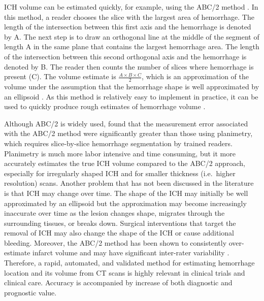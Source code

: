 \documentclass{elsarticle_nonatbib}\usepackage[]{graphicx}\usepackage[]{color}
\begin{document}
ICH volume can be estimated quickly, for example,  using the ABC/2 method \citep{broderick_volume_1993}.  In this method, a reader chooses the slice with the largest area of hemorrhage.  The length of the intersection between this first axis and the hemorrhage is denoted by A. The next step is to draw an orthogonal line  at the middle of the segment of length A in the same plane that contains the largest hemorrhage area. The length of the intersection between this second orthogonal axis and the hemorrhage is denoted by B.  The reader then counts the number of slices where hemorrhage is present (C).  The volume estimate is $\frac{A\times B\times C}{2}$, which is an approximation of the volume under the assumption that the hemorrhage shape is well approximated by an ellipsoid \citep{kothari_abcs_1996}.  As this method is relatively easy to implement in practice, it can be used to quickly produce rough estimates of hemorrhage volume \citep{webb_accuracy_2015}.

Although ABC/2 is widely used, \citet{divani_abcs_2011} found that the measurement error associated with the ABC/2 method were significantly greater than those using planimetry, which requires slice-by-slice hemorrhage segmentation by trained readers. Planimetry is much more labor intensive and time consuming, but it more accurately estimates the true ICH volume compared to the ABC/2 approach, especially for irregularly shaped ICH and for smaller thickness (i.e.~higher resolution) scans.
Another problem that has not been discussed in the literature is that ICH may change over time. The shape of the ICH may initially be well approximated by an ellipsoid but the approximation may become increasingly inaccurate over time as the lesion changes shape, migrates through the surrounding tissues, or breaks down.  Surgical interventions that target the removal of ICH may also change the shape of the ICH or cause additional bleeding.
Moreover, the ABC/2 method has been shown to consistently over-estimate infarct volume \citep{pedraza_reliability_2012} and may have significant inter-rater variability \citep{hussein_reliability_2013}. Therefore, a rapid, automated, and validated method for estimating hemorrhage location and its volume from CT scans is highly relevant in clinical trials and clinical care.  Accuracy is accompanied by increase of both diagnostic and prognostic value.
\end{document}
